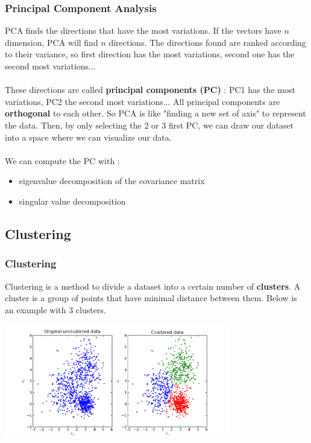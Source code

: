 \documentclass{beamer}
\begin{document}
\begin{frame}
  \frametitle{Principal Component Analysis}
  PCA finds the directions that have the most variations. If the vectors have
  $n$ dimension, PCA will find $n$ directions. The directions found are ranked
  according to their variance, so first direction has the most variations,
  second one has the second most variations...\\~\\

  These directions are called \textbf{principal components (PC)} : PC1 has the most
  variations, PC2 the second most variations...
  All principal components are \textbf{orthogonal} to each other. So PCA is like
  "finding a new set of axis" to represent the data. Then, by only selecting the
  2 or 3 first PC, we can draw our dataset into a space where we can visualize
  our data.\\~\\

  We can compute the PC with :
  \begin{itemize}
    \item eigenvalue decomposition of the covariance matrix
    \item singular value decomposition
  \end{itemize}
\end{frame}

\subsection{Clustering}
\begin{frame}
  \frametitle{Clustering}
  Clustering is a method to divide a dataset into a certain number of
  \textbf{clusters}. A cluster is a group of points that have minimal distance
  between them. Below is an example with 3 clusters.

  \center
  \includegraphics[height=5cm]{img/kmeans_2d.png}
\end{frame}
\end{document}
